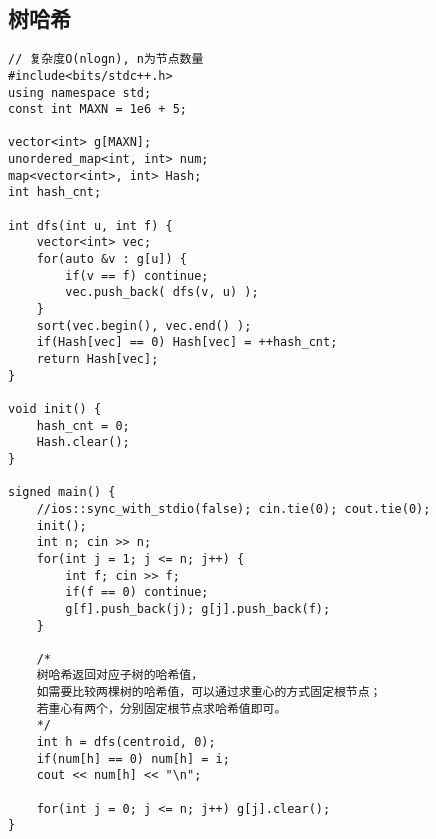 \subsection{树哈希}
\begin{lstlisting}
// 复杂度O(nlogn), n为节点数量
#include<bits/stdc++.h>
using namespace std;
const int MAXN = 1e6 + 5;

vector<int> g[MAXN];
unordered_map<int, int> num;
map<vector<int>, int> Hash;
int hash_cnt;

int dfs(int u, int f) {
	vector<int> vec;
	for(auto &v : g[u]) {
		if(v == f) continue;
		vec.push_back( dfs(v, u) );
	} 
	sort(vec.begin(), vec.end() );
	if(Hash[vec] == 0) Hash[vec] = ++hash_cnt;
 	return Hash[vec];
}

void init() {
	hash_cnt = 0;
	Hash.clear();
}

signed main() {
	//ios::sync_with_stdio(false); cin.tie(0); cout.tie(0);
	init();
	int n; cin >> n;
	for(int j = 1; j <= n; j++) {
		int f; cin >> f;
		if(f == 0) continue;
		g[f].push_back(j); g[j].push_back(f);
	}
	
	/*
	树哈希返回对应子树的哈希值，
	如需要比较两棵树的哈希值，可以通过求重心的方式固定根节点；
	若重心有两个，分别固定根节点求哈希值即可。
	*/
	int h = dfs(centroid, 0);
	if(num[h] == 0) num[h] = i;
	cout << num[h] << "\n";
	
	for(int j = 0; j <= n; j++) g[j].clear();
} 
\end{lstlisting}